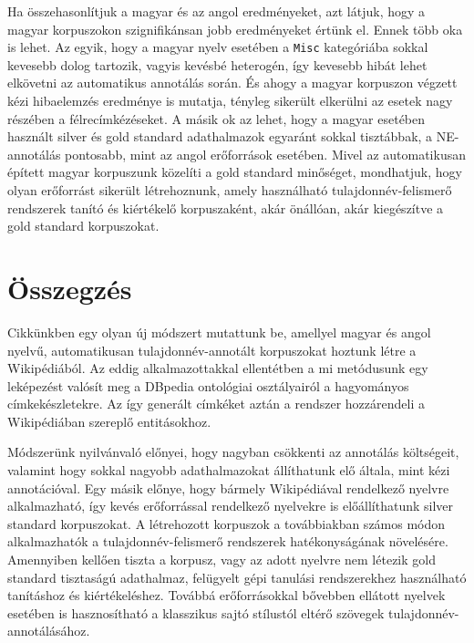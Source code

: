 \documentclass{llncs}
\begin{document}
Ha összehasonlítjuk a magyar és az angol eredményeket, azt látjuk, hogy a magyar korpuszokon szignifikánsan jobb eredményeket értünk el. Ennek több oka is lehet. 
Az egyik, hogy a magyar nyelv esetében a \texttt{Misc} kategóriába sokkal kevesebb dolog tartozik, vagyis kevésbé heterogén, így kevesebb hibát lehet elkövetni az automatikus annotálás során. És ahogy a magyar korpuszon végzett kézi hibaelemzés eredménye is mutatja, tényleg sikerült elkerülni az esetek nagy részében a félrecímkézéseket. A másik ok az lehet, hogy a magyar esetében használt silver és gold standard adathalmazok egyaránt sokkal tisztábbak, a NE-annotálás pontosabb, mint az angol erőforrások esetében. Mivel az automatikusan épített magyar korpuszunk közelíti a gold standard minőséget, mondhatjuk, hogy olyan erőforrást sikerült létrehoznunk, amely használható tulajdonnév-felismerő rendszerek tanító és kiértékelő korpuszaként, akár önállóan, akár kiegészítve a gold standard korpuszokat. 

\section{Összegzés}
\label{conc}

Cikkünkben egy olyan új módszert mutattunk be, amellyel magyar és angol nyelvű, automatikusan tulajdonnév-annotált korpuszokat hoztunk létre a Wikipédiából. Az eddig alkalmazottakkal ellentétben a mi metódusunk egy leképezést valósít meg a DBpedia ontológiai osztályairól a hagyományos címkekészletekre. Az így generált címkéket aztán a rendszer hozzárendeli a Wikipédiában szereplő entitásokhoz. 

Módszerünk nyilvánvaló előnyei, hogy nagyban csökkenti az annotálás költségeit, valamint hogy sokkal nagyobb adathalmazokat állíthatunk elő általa, mint kézi annotációval. Egy másik előnye, hogy bármely Wikipédiával rendelkező nyelvre alkalmazható, így kevés erőforrással rendelkező nyelvekre is előállíthatunk silver standard korpuszokat. A létrehozott korpuszok a továbbiakban számos módon alkalmazhatók a tulajdonnév-felismerő rendszerek hatékonyságának növelésére. Amennyiben kellően tiszta a korpusz, vagy az adott nyelvre nem létezik gold standard tisztaságú adathalmaz, felügyelt gépi tanulási rendszerekhez használható tanításhoz és kiértékeléshez. Továbbá erőforrásokkal bővebben ellátott nyelvek esetében is hasznosítható a klasszikus sajtó stílustól eltérő szövegek tulajdonnév-annotálásához. 
\end{document}
